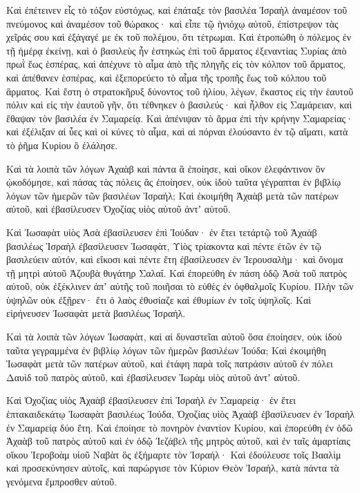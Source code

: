 {\par }{\PP {}Καὶ ἐπέτεινεν εἷς τὸ τόξον εὐστόχως, καὶ ἐπάταξε τὸν βασιλέα Ἰσραὴλ ἀναμέσον τοῦ πνεύμονος καὶ ἀναμέσον τοῦ θώρακος· καὶ εἶπε τῷ ἡνιόχῳ αὐτοῦ, ἐπίστρεψον τὰς χεῖράς σου καὶ ἐξάγαγέ με ἐκ τοῦ πολέμου, ὅτι τέτρωμαι.
Καὶ ἐτροπώθη ὁ πόλεμος ἐν τῇ ἡμέρᾳ ἐκείνῃ, καὶ ὁ βασιλεὺς ἦν ἑστηκὼς ἐπὶ τοῦ ἅρματος ἐξεναντίας Συρίας ἀπὸ πρωῒ ἕως ἑσπέρας, καὶ ἀπέχυνε τὸ αἷμα ἀπὸ τῆς πληγῆς εἰς τὸν κόλπον τοῦ ἅρματος, καὶ ἀπέθανεν ἑσπέρας, καὶ ἐξεπορεύετο τὸ αἷμα τῆς τροπῆς ἕως τοῦ κόλπου τοῦ ἅρματος.
Καὶ ἔστη ὁ στρατοκῆρυξ δύνοντος τοῦ ἡλίου, λέγων, ἕκαστος εἰς τὴν ἑαυτοῦ πόλιν καὶ εἰς τὴν ἑαυτοῦ γῆν,
ὅτι τέθνηκεν ὁ βασιλεύς· καὶ ἦλθον εἰς Σαμάρειαν, καὶ ἔθαψαν τὸν βασιλέα ἐν Σαμαρείᾳ.
Καὶ ἀπένιψαν τὸ ἅρμα ἐπὶ τὴν κρήνην Σαμαρείας· καὶ ἐξέλιξαν αἱ ὗες καὶ οἱ κύνες τὸ αἷμα, καὶ αἱ πόρναι ἐλούσαντο ἐν τῷ αἵματι, κατὰ τὸ ῥῆμα Κυρίου ὃ ἐλάλησε.
\par }{\PP {}Καὶ τὰ λοιπὰ τῶν λόγων Ἀχαὰβ καὶ πάντα ἃ ἐποίησε, καὶ οἴκον ἐλεφάντινον ὃν ᾠκοδόμησε, καὶ πάσας τὰς πόλεις ἃς ἐποίησεν, οὐκ ἰδοὺ ταῦτα γέγραπται ἐν βιβλίῳ λόγων τῶν ἡμερῶν τῶν βασιλέων Ἰσραήλ;
Καὶ ἐκοιμήθη Ἀχαὰβ μετὰ τῶν πατέρων αὐτοῦ, καὶ ἐβασίλευσεν Ὀχοζίας υἱὸς αὐτοῦ ἀντʼ αὐτοῦ.
\par }{\PP {}Καὶ Ἰωσαφὰτ υἱὸς Ἀσὰ ἐβασίλευσεν ἐπὶ Ἰούδαν· ἐν ἔτει τετάρτῷ τοῦ Ἀχαὰβ βασιλέως Ἰσραὴλ ἐβασίλευσεν
Ἰωσαφὰτ, Υἱὸς τρίακοντα καὶ πέντε ἐτῶν ἐν τῷ βασιλεύειν αὐτόν, καὶ εἴκοσι καὶ πέντε ἔτη ἐβασίλευσεν ἐν Ἰερουσαλὴμ· καὶ ὄνομα τῇ μητρὶ αὐτοῦ Ἀζουβὰ θυγάτηρ Σαλαΐ.
Καὶ ἐπορεύθη ἐν πάση ὁδῷ Ἀσὰ τοῦ πατρὸς αὐτοῦ, οὐκ ἐξέκλινεν ἀπʼ αὐτῆς τοῦ ποιῆσαι τὸ εὐθὲς ἐν ὀφθαλμοῖς Κυρίου.
Πλὴν τῶν ὑψηλῶν οὐκ ἐξῇρεν· ἔτι ὁ λαὸς ἐθυσίαζε καὶ ἐθυμίων ἐν τοῖς ὑψηλοῖς.
Καὶ εἰρήνευσεν Ἰωσαφὰτ μετὰ βασιλέως Ἰσραήλ.
\par }{\PP {}Καὶ τὰ λοιπὰ τῶν λόγων Ἰωσαφὰτ, καὶ αἱ δυναστεῖαι αὐτοῦ ὅσα ἐποίησεν, οὐκ ἰδοὺ ταῦτα γεγραμμένα ἐν βιβλίῳ λόγων τῶν ἡμερῶν βασιλέων Ἰούδα;
Καὶ ἐκοιμήθη Ἰωσαφὰτ μετὰ τῶν πατέρων αὐτοῦ, καὶ ἐτάφη παρὰ τοῖς πατράσιν αὐτοῦ ἐν πόλει Δαυὶδ τοῦ πατρὸς αὐτοῦ, καὶ ἐβασίλευσεν Ἰωρὰμ υἱὸς αὐτοῦ ἀντʼ αὐτοῦ.
\par }{\PP {}Καὶ Ὀχοζίας υἱὸς Ἀχαὰβ ἐβασίλευσεν ἐπὶ Ἰσραὴλ ἐν Σαμαρείᾳ· ἐν ἔτει ἑπτακαιδεκάτῳ Ἰωσαφὰτ βασιλέως Ἰούδα, Ὀχοζίας υἱὸς Ἀχαὰβ ἐβασίλευσεν ἐν Ἰσραὴλ ἐν Σαμαρείᾳ δύο ἔτη.
Καὶ ἐποίησε τὸ πονηρὸν ἐναντίον Κυρίου, καὶ ἐπορεύθη ἐν ὁδῶ Ἀχαὰβ τοῦ πατρὸς αὐτοῦ καὶ ἐν ὁδῷ Ἰεζάβελ τῆς μητρὸς αὐτοῦ, καὶ ἐν ταῖς ἁμαρτίαις οἴκου Ἱεροβοὰμ υἱοῦ Ναβὰτ ὃς ἐξήμαρτε τὸν Ἰσραήλ·
Καὶ ἐδούλευσε τοῖς Βααλὶμ καὶ προσεκύνησεν αὐτοῖς, καὶ παρώργισε τὸν Κύριον Θεὸν Ἰσραὴλ, κατὰ πάντα τὰ γενόμενα ἔμπροσθεν αὐτοῦ.
\par }